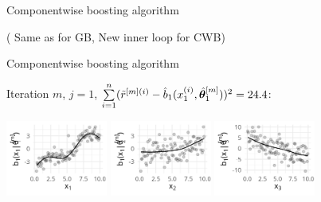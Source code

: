\documentclass[11pt,compress,t,notes=noshow, xcolor=table]{beamer}
\begin{document}

\begin{vbframe}{Componentwise boosting algorithm}


({\color{lightgray} Same as for GB, \color{algocol} New inner loop for CWB})

\end{vbframe}


\begin{vbframe}{Componentwise boosting algorithm}




{\footnotesize Iteration $m$, $j = 1$, $\sum  \limits_{i=1}^n (\tilde{r}^{[m](i)} - \hat{b}_1(x^{(i)}_1, \hat{\bm{\theta}}^{[m]}_1))^2 = 24.4$: }
\begin{center}
\includegraphics[width=0.25\textwidth]{figure/boosting-cwb-bl1-points.png}
\hspace*{0.5cm}
{\includegraphics[width=0.25\textwidth]{figure/boosting-cwb-bl2-points.png}}
\hspace*{0.5cm}
{\includegraphics[width=0.25\textwidth]{figure/boosting-cwb-bl3-points.png}}
\end{center}
\end{vbframe}

\end{document}
